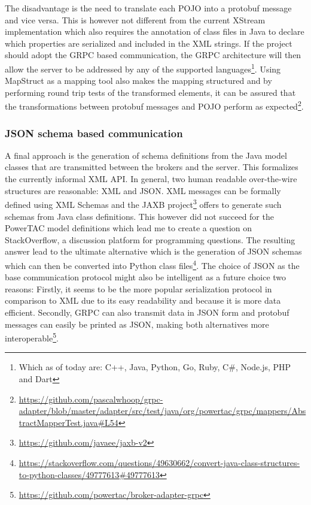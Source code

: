 The disadvantage is the need to translate each \ac{POJO} into a protobuf message and
vice versa. This is however not different from the current XStream implementation which also requires the annotation of
class files in Java to declare which properties are serialized and included in the \ac{XML} strings. If the project
should adopt the \ac{GRPC} based communication, the \ac{GRPC} architecture will then allow the server to be addressed by any of the supported languages\footnote{Which as of today are: C++, Java, Python, Go, Ruby, C\#, Node.js, PHP and
Dart}. Using MapStruct as a mapping tool also makes the mapping structured and by performing round trip tests of the
transformed elements, it can be assured that the transformations between protobuf messages and \ac{POJO} perform as
expected\footnote{\url{https://github.com/pascalwhoop/grpc-adapter/blob/master/adapter/src/test/java/org/powertac/grpc/mappers/AbstractMapperTest.java\#L54}}.



\subsubsection{JSON schema based communication}%
\label{sub:json_schema_based_communication}


A final approach is the generation of schema definitions from the Java model classes that are transmitted between the
brokers and the server. This formalizes the currently informal \ac{XML} \ac{API}. In general, two human readable over-the-wire structures are reasonable: \ac{XML} and \ac{JSON}.
\ac{XML} messages can be formally defined using \ac{XML} Schemas and the \ac{JAXB} project\footnote{\url{https://github.com/javaee/jaxb-v2}} offers to generate such schemas from Java class definitions. This
however did not succeed for the \ac{PowerTAC} model definitions which lead me to create a question on StackOverflow, a
discussion platform for programming questions. The resulting answer lead to the ultimate alternative which is the
generation of \ac{JSON} schemas which can then be converted into Python class files\footnote{\url{https://stackoverflow.com/questions/49630662/convert-java-class-structures-to-python-classes/49777613\#49777613}}.
The choice of \ac{JSON} as the base communication protocol might also be intelligent as a future choice two reasons:
Firstly, it seems to be the more popular serialization protocol in comparison to \ac{XML} \citep{jsonxml} due to its
easy readability and because it is more data efficient. Secondly, \ac{GRPC} can also transmit data in \ac{JSON} form
and protobuf messages can easily be printed as \ac{JSON}, making both alternatives more interoperable\footnote{\url{https://github.com/powertac/broker-adapter-grpc} }.

